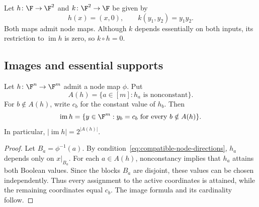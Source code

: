 \begin{example}\label{ex:composition-blocked-path}
Let $h\colon\F\to\F^2$ and $k\colon\F^2\to\F$ be given by
\[
    h(x)=(x,0),\qquad k(y_1,y_2)=y_1y_2.
\]
Both maps admit node maps. Although $k$ depends essentially on both inputs, its restriction to $\operatorname{im}h$ is zero, so $k\circ h=0$.
\begin{center}
\end{center}
\end{example}

\subsection{Images and essential supports}

\begin{proposition}\label{prop:node-map-image-face}
Let $h\colon\F^n\to\F^m$ admit a node map $\phi$. Put
\[
    A(h)=\{a\in[m]:h_a\text{ is nonconstant}\}.
\]
For $b\notin A(h)$, write $c_b$ for the constant value of $h_b$. Then
\begin{equation}\label{eq:node-map-image-face}
    \operatorname{im}h
    =\{y\in\F^m:y_b=c_b\text{ for every }b\notin A(h)\}.
\end{equation}
In particular, $|\operatorname{im}h|=2^{|A(h)|}$.
\end{proposition}

\begin{proof}
Let $B_a=\phi^{-1}(a)$. By condition~\eqref{eq:compatible-node-directions}, $h_a$ depends only on $x|_{B_a}$. For each $a\in A(h)$, nonconstancy implies that $h_a$ attains both Boolean values. Since the blocks $B_a$ are disjoint, these values can be chosen independently. Thus every assignment to the active coordinates is attained, while the remaining coordinates equal $c_b$. The image formula and its cardinality follow.
\end{proof}

